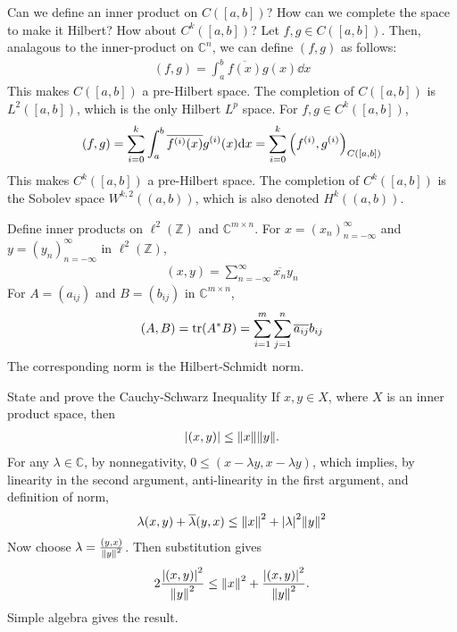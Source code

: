 \documentclass[avery5388,grid,frame]{flashcards}
\def\Cx{\mathbb{C}}
\begin{document}
\begin{flashcard}
    {Can we define an inner product on $C([a,b])$?  How can we complete the space to make it Hilbert?  How about $C^k([a,b])$?}
    Let $f, g \in C([a,b])$.  Then, analagous to the inner-product on $\Cx^n$, we can define $(f,g)$ as follows:
    \begin{align*}
        (f,g) = \int_a^b \overline{f(x)}g(x) \dd x
    \end{align*}
    This makes $C([a,b])$ a pre-Hilbert space.  The completion of $C([a,b])$ is $L^2([a,b])$, which is the only Hilbert $L^p$ space.  For $f, g \in C^k([a,b])$,
    \begin{align*}
        (f,g) = \sum_{i=0}^k\int_a^b \overline{f^{(i)}(x)}g^{(i)}(x) \dd x = \sum_{i=0}^k \qty(f^{(i)}, g^{(i)})_{C([a,b])}
    \end{align*}
    This makes $C^k([a,b])$ a pre-Hilbert space.  The completion of $C^k([a,b])$ is the Sobolev space $W^{k,2}((a,b))$, which is also denoted $H^k((a,b))$.
\end{flashcard}

\begin{flashcard}
    {Define inner products on $\ell^2(\mathbb{Z})$ and $\Cx^{m\times n}$.}
    For $x = (x_n)_{n=-\infty}^\infty$ and $y = (y_n)_{n=-\infty}^\infty$ in $\ell^2(\mathbb{Z})$,
    \begin{align*}
        (x,y) = \sum_{n=-\infty}^\infty \overline{x_n}y_n
    \end{align*}
    For $A = (a_{ij})$ and $B = (b_{ij})$ in $\Cx^{m\times n}$,
    \begin{align*}
        (A, B) = \tr (A^* B) = \sum_{i=1}^m\sum_{j=1}^n\overline{a_{ij}}b_{ij}
    \end{align*}
    The corresponding norm is the Hilbert-Schmidt norm.
\end{flashcard}

\begin{flashcard}
    {State and prove the Cauchy-Schwarz Inequality}
    If $x,y \in X$, where $X$ is an inner product space, then
    \begin{align*}
        \abs{(x,y)} \leq \norm{x} \norm{y}.
    \end{align*}
    For any $\lambda \in \Cx$, by nonnegativity, $0 \leq (x - \lambda y, x - \lambda y)$, which implies, by linearity in the second argument, anti-linearity in the first argument, and definition of norm,
    \begin{align*}
        \lambda(x,y) + \overline{\lambda}(y,x) \leq \norm{x}^2 + \abs{\lambda}^2\norm{y}^2
    \end{align*}
    Now choose $\lambda = \frac{(y,x)}{\norm{y}^2}$.  Then substitution gives
    \begin{align*}
        2\frac{\abs{(x,y)}^2}{\norm{y}^2} \leq \norm{x}^2 + \frac{\abs{(x,y)}^2}{\norm{y}^2}.
    \end{align*}
    Simple algebra gives the result.
\end{flashcard}
\end{document}
